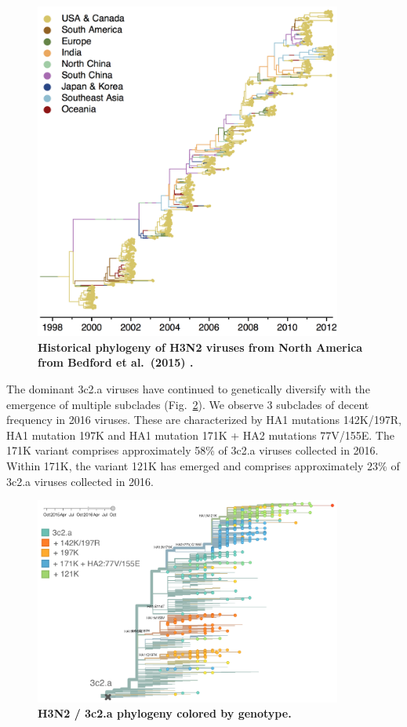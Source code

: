 \documentclass[11pt,oneside,letterpaper]{article}
\begin{document}
\begin{figure}[H]
	\centering
	\includegraphics[width=0.9\textwidth]{../figures/sep-2016/H3N2_historical_tree_na.png}
	\caption{\textbf{Historical phylogeny of H3N2 viruses from North America from Bedford et al.\ (2015) \cite{bedford2015global}.}
	}
	\label{H3N2_historical_tree_na}
\end{figure}

\pagebreak

The dominant 3c2.a viruses have continued to genetically diversify with the emergence of multiple subclades (Fig.\ \ref{H3N2_3c2a_tree}). We observe 3 subclades of decent frequency in 2016 viruses. These are characterized by HA1 mutations 142K/197R, HA1 mutation 197K and HA1 mutation 171K + HA2 mutations 77V/155E. The 171K variant comprises approximately 58\% of 3c2.a viruses collected in 2016. Within 171K, the variant 121K has emerged and comprises approximately 23\% of 3c2.a viruses collected in 2016.

\begin{figure}[H]
	\centering
	\includegraphics[width=0.9\textwidth]{../figures/sep-2016/H3N2_3c2a_tree.png}
	\caption{\textbf{H3N2 / 3c2.a phylogeny colored by genotype.}
	}
	\label{H3N2_3c2a_tree}
\end{figure}
\end{document}
